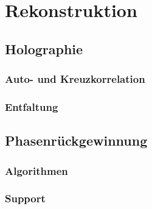 \chapter{Rekonstruktion}
\section{Holographie}
\subsection{Auto- und Kreuzkorrelation}
\subsection{Entfaltung}

\section{Phasenrückgewinnung}
\subsection{Algorithmen}
\subsection{Support}



